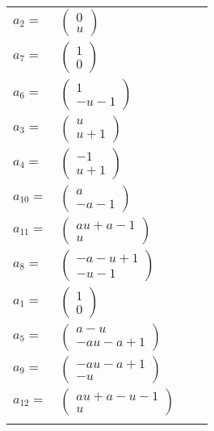 \documentclass[1p]{elsarticle_modified}
\theoremstyle{definition}
\begin{document}
\begin{tabular}{m{7pt} m{180pt} m{7pt} m{180pt} }
\flushright $a_{2}=$&$\begin{pmatrix}0\\u\end{pmatrix}$ \\
\flushright $a_{7}=$&$\begin{pmatrix}1\\0\end{pmatrix}$ \\
\flushright $a_{6}=$&$\begin{pmatrix}1\\- u-1\end{pmatrix}$ \\
\flushright $a_{3}=$&$\begin{pmatrix}u\\u+1\end{pmatrix}$ \\
\flushright $a_{4}=$&$\begin{pmatrix}-1\\u+1\end{pmatrix}$ \\
\flushright $a_{10}=$&$\begin{pmatrix}a\\- a-1\end{pmatrix}$ \\
\flushright $a_{11}=$&$\begin{pmatrix}a u+a-1\\u\end{pmatrix}$ \\
\flushright $a_{8}=$&$\begin{pmatrix}- a- u+1\\- u-1\end{pmatrix}$ \\
\flushright $a_{1}=$&$\begin{pmatrix}1\\0\end{pmatrix}$ \\
\flushright $a_{5}=$&$\begin{pmatrix}a- u\\- a u- a+1\end{pmatrix}$ \\
\flushright $a_{9}=$&$\begin{pmatrix}- a u- a+1\\- u\end{pmatrix}$ \\
\flushright $a_{12}=$&$\begin{pmatrix}a u+a- u-1\\u\end{pmatrix}$\\&\end{tabular}
\end{document}
